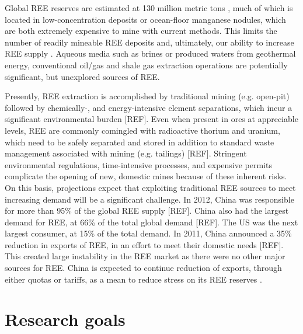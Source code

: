 Global REE reserves are estimated at 130 million metric tons \citep{USGS_commsumm}, much of which is located in low-concentration deposits or ocean-floor manganese nodules, which are both extremely expensive to mine with current methods.
This limits the number of readily mineable REE deposits and, ultimately, our ability to increase REE supply \citep{JRC_2011, Alonso_EST_2012}.
Aqueous media such as brines or produced waters from geothermal energy, conventional oil/gas and shale gas extraction operations are potentially significant, but unexplored sources of REE.

Presently, REE extraction is accomplished by traditional mining (e.g. open-pit) followed by chemically-, and energy-intensive element separations, which incur a significant environmental burden [REF].
Even when present in ores at appreciable levels, REE are commonly comingled with radioactive thorium and uranium, which need to be safely separated and stored in addition to standard waste management associated with mining (e.g. tailings) [REF].
Stringent environmental regulations, time-intensive processes, and expensive permits complicate the opening of new, domestic mines because of these inherent risks.
On this basis, projections expect that exploiting traditional REE sources to meet increasing demand will be a significant challenge.
In 2012, China was responsible for more than 95\% of the global REE supply [REF].
China also had the largest demand for REE, at 66\% of the total global demand [REF].
The US was the next largest consumer, at 15\% of the total demand.
In 2011, China announced a 35\% reduction in exports of REE, in an effort to meet their domestic needs [REF].
This created large instability in the REE market as there were no other major sources for REE.
China is expected to continue reduction of exports, through either quotas or tariffs, as a mean to reduce stress on its REE reserves \citep{FrostSullivan_REEmarket, USGS_commsumm}.

\section{Research goals}

